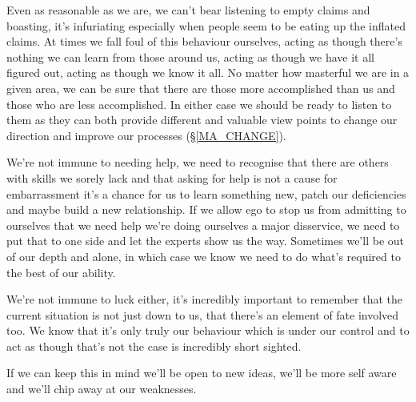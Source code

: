 \cleartorightpage
{\small

Even as reasonable as we are, we can't bear listening to empty claims and boasting, it's infuriating especially when people seem to be eating up the inflated claims. At times we fall foul of this behaviour ourselves, acting as though there's nothing we can learn from those around us, acting as though we have it all figured out, acting as though we know it all. No matter how masterful we are in a given area, we can be sure that there are those more accomplished than us and those who are less accomplished. In either case we should be ready to listen to them as they can both provide different and valuable view points to change our direction and improve our processes (\S \ref{MA_CHANGE}).

We're not immune to needing help, we need to recognise that there are others with skills we sorely lack and that asking for help is not a cause for embarrassment it's a chance for us to learn something new, patch our deficiencies and maybe build a new relationship. If we allow ego to stop us from admitting to ourselves that we need help we're doing ourselves a major disservice, we need to put that to one side and let the experts show us the way. Sometimes we'll be out of our depth and alone, in which case we know we need to do what's required to the best of our ability.

We're not immune to luck either, it's incredibly important to remember that the current situation is not just down to us, that there's an element of fate involved too. We know that it's only truly our behaviour which is under our control and to act as though that's not the case is incredibly short sighted.

If we can keep this in mind we'll be open to new ideas, we'll be more self aware and we'll chip away at our weaknesses.

}
\cleartoleftpage
